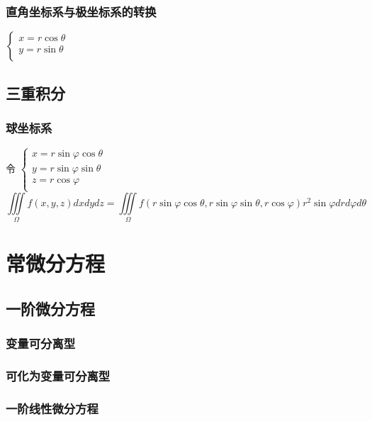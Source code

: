 ﻿\documentclass[a4paper,12pt,UTF8]{ctexart}
\begin{document}
    \subsubsection{直角坐标系与极坐标系的转换}
    \(\begin{cases}
        x=r \cos \theta\\
        y=r \sin \theta\\
    \end{cases} \) 

    \subsection{三重积分}

    \subsubsection{球坐标系}
    令
    \(\begin{cases}
        x=r \sin \varphi \cos \theta \\
        y=r \sin \varphi \sin \theta \\
        z=r \cos \varphi \\
    \end{cases} \) 
    \[\iiint \limits_{\Omega} f(x,y,z)dxdydz=\iiint \limits_{\Omega} f(r \sin \varphi \cos \theta,r \sin \varphi \sin \theta,r \cos \varphi )r^2 \sin \varphi dr d\varphi d\theta\]

    \section{常微分方程}
    
    \subsection{一阶微分方程}

    \subsubsection{变量可分离型}

    \subsubsection{可化为变量可分离型}

    \subsubsection{一阶线性微分方程}
\end{document}

